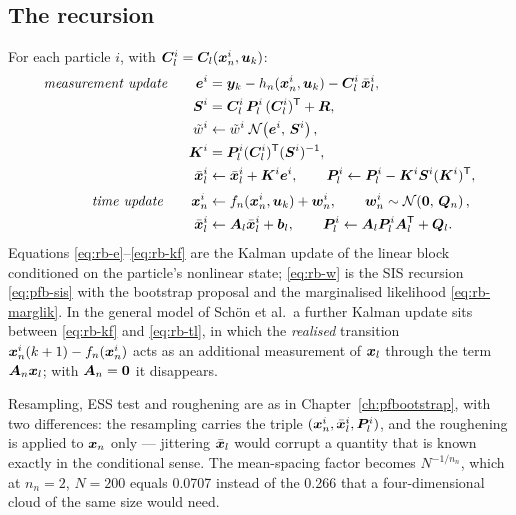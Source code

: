 \subsection{The recursion}
For each particle $i$, with $\bm{C}_l^i = \bm{C}_l(\bm{x}_n^i,\bm{u}_k)$:
\begin{align}
  \text{\emph{measurement update}}\qquad
  \bm e^i &= \bm{y}_k - h_n(\bm{x}_n^i,\bm{u}_k) - \bm{C}_l^i\,\bar{\bm{x}}_l^i, \label{eq:rb-e}\\
  \bm{S}^i &= \bm{C}_l^i\,\bm{P}_l^i\,(\bm{C}_l^i)^{\mathsf{T}} + \bm{R}, \label{eq:rb-S}\\
  \tilde w^i &\leftarrow \tilde w^i\; \mathcal{N}\!\left(\bm e^i,\,\bm{S}^i\right), \label{eq:rb-w}\\
  \bm{K}^i &= \bm{P}_l^i (\bm{C}_l^i)^{\mathsf{T}} (\bm{S}^i)^{-1}, \label{eq:rb-K}\\
  \bar{\bm{x}}_l^i &\leftarrow \bar{\bm{x}}_l^i + \bm{K}^i \bm e^i, \qquad
  \bm{P}_l^i \leftarrow \bm{P}_l^i - \bm{K}^i \bm{S}^i (\bm{K}^i)^{\mathsf{T}}, \label{eq:rb-kf}\\[2pt]
  \text{\emph{time update}}\qquad
  \bm{x}_n^i &\leftarrow f_n(\bm{x}_n^i,\bm{u}_k) + \bm{w}_n^i, \qquad \bm{w}_n^i\sim\mathcal{N}\!\left(\bm 0,\,\bm{Q}_n\right), \label{eq:rb-tn}\\
  \bar{\bm{x}}_l^i &\leftarrow \bm{A}_l \bar{\bm{x}}_l^i + \bm b_l, \qquad
  \bm{P}_l^i \leftarrow \bm{A}_l \bm{P}_l^i \bm{A}_l^{\mathsf{T}} + \bm{Q}_l. \label{eq:rb-tl}
\end{align}
Equations \eqref{eq:rb-e}--\eqref{eq:rb-kf} are the Kalman update of the linear block conditioned
on the particle's nonlinear state; \eqref{eq:rb-w} is the SIS recursion \eqref{eq:pfb-sis} with the
bootstrap proposal and the marginalised likelihood \eqref{eq:rb-marglik}.  In the general model of
Schön et al.\ a further Kalman update sits between \eqref{eq:rb-kf} and \eqref{eq:rb-tl}, in which
the \emph{realised} transition $\bm{x}_n^i(k+1) - f_n(\bm{x}_n^i)$ acts as an additional measurement of
$\bm{x}_l$ through the term $\bm{A}_n\bm{x}_l$; with $\bm{A}_n = \bm 0$ it disappears.

Resampling, ESS test and roughening are as in Chapter~\ref{ch:pfbootstrap}, with two differences:
the resampling carries the triple $(\bm{x}_n^i, \bar{\bm{x}}_l^i, \bm{P}_l^i)$, and the roughening is
applied to $\bm{x}_n$ only --- jittering $\bar{\bm{x}}_l$ would corrupt a quantity that is known exactly
in the conditional sense.  The mean-spacing factor becomes $N^{-1/n_n}$, which at $n_n = 2$,
$N=200$ equals \num{0.0707} instead of the \num{0.266} that a four-dimensional cloud of the same
size would need.


